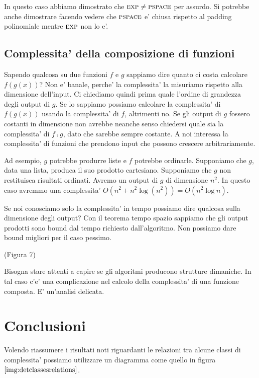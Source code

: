 In questo caso abbiamo dimostrato che $\textsc{exp} \not= \textsc{pspace}$ per assurdo. Si potrebbe anche dimostrare
facendo vedere che $\textsc{pspace}$ e' chiusa rispetto al padding polinomiale mentre $\textsc{exp}$ non lo e'.

\subsection{Complessita' della composizione di funzioni}

Sapendo qualcosa su due funzioni $f$ e $g$ sappiamo dire quanto ci costa calcolare $f(g(x))$? Non e'
banale, perche' la complessita' la misuriamo rispetto alla dimensione dell'input. Ci chiediamo
quindi prima quale l'ordine di grandezza degli output di $g$. Se lo sappiamo possiamo calcolare la
complessita' di $f(g(x))$ usando la complessita' di $f$, altrimenti no. Se gli output di $g$ fossero
costanti in dimensione non avrebbe neanche senso chiedersi quale sia la complessita' di $f \comp g$,
dato che sarebbe sempre costante. A noi interessa la complessita' di funzioni che prendono input che
possono crescere arbitrariamente.

Ad esempio, $g$ potrebbe produrre liste e $f$ potrebbe ordinarle. Supponiamo che $g$, data una
lista, produca il suo prodotto cartesiano. Supponiamo che $g$ non restituisca risultati ordinati.
Avremo un output di $g$ di dimensione $n^{2}$. In questo caso avremmo una complessita' $O(n^{2} +
n^{2}\log(n^{2})) = O(n^{2}\log{n})$.

Se noi conosciamo solo la complessita' in tempo possiamo dire qualcosa sulla dimensione degli
output? Con il teorema tempo spazio sappiamo che gli output prodotti sono bound dal tempo richiesto
dall'algoritmo. Non possiamo dare bound migliori per il caso pessimo.

(Figura 7)

Bisogna stare attenti a capire se gli algoritmi producono strutture dimaniche. In tal caso c'e' una
complicazione nel calcolo della complessita' di una funzione composta. E' un'analisi delicata.

\section{Conclusioni}

Volendo riassumere i risultati noti riguardanti le relazioni tra alcune classi di complessita'
possiamo utilizzare un diagramma come quello in figura $\ref{img:detclassesrelations}$. 

